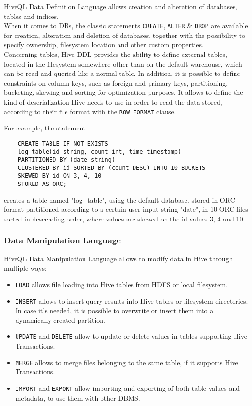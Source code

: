 HiveQL Data Definition Language allows creation and alteration of databases, tables and indices.\\When it comes to DBs, the classic statements \verb|CREATE|, \verb|ALTER| \& \verb|DROP| are available for creation, alteration and deletion of databases, together with the possibility to specify ownership, filesystem location and other custom properties.\\
Concerning tables, Hive DDL provides the ability to define external tables, located in the filesystem somewhere other than on the default warehouse, which can be read and queried like a normal table. In addition, it is possible to define constraints on column keys, such as foreign and primary keys, partitioning, bucketing, skewing and sorting for optimization purposes. It allows to define the kind of deserialization Hive needs to use in order to read the data stored, according to their file format with the \verb|ROW FORMAT| clause.

For example, the statement

\begin{verbatim}
    CREATE TABLE IF NOT EXISTS 
    log_table(id string, count int, time timestamp)
    PARTITIONED BY (date string)
    CLUSTERED BY id SORTED BY (count DESC) INTO 10 BUCKETS
    SKEWED BY id ON 3, 4, 10
    STORED AS ORC;
\end{verbatim}

creates a table named "log\_table", using the default database, stored in ORC format partitioned according to a certain user-input string "date", in 10 ORC files sorted in descending order, where values are skewed on the id values 3, 4 and 10.

\subsubsection{Data Manipulation Language}

HiveQL Data Manipulation Language allows to modify data in Hive through multiple ways:

\begin{itemize}
    \item \verb|LOAD| allows file loading into Hive tables from HDFS or local filesystem.  
    \item \verb|INSERT| allows to insert query results into Hive tables or filesystem directories. In case it's needed, it is possible to overwrite or insert them into a dynamically created partition. 
    \item \verb|UPDATE| and \verb|DELETE| allow to update or delete values in tables supporting Hive Transactions.
    \item \verb|MERGE| allows to merge files belonging to the same table, if it supports Hive Transactions.
    \item \verb|IMPORT| and \verb|EXPORT| allow importing and exporting of both table values and metadata, to use them with other DBMS.
\end{itemize}

